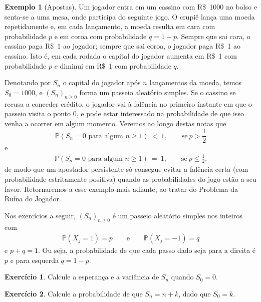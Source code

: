 \documentclass[12pt,portuguese]{article}
\theoremstyle{definition}
\newtheorem{example}[example]{Exemplo}
\theoremstyle{plainexercise}
\newtheorem{exercise}{Exercício}
\theoremstyle{starredexercise}
\theoremstyle{definition}
\begin{document}
\begin{example}[Apostas]\label{ex:apostas}
Um jogador entra em um cassino com R\$~1000 no bolso e senta-se a uma mesa,
onde participa do seguinte jogo. O crupiê lança uma moeda repetidamente e, em
cada lançamento, a moeda resulta em cara com probabilidade $p$ e em coroa com
probabilidade $q = 1 - p$. Sempre que sai cara, o cassino paga R\$~1 ao
jogador; sempre que sai coroa, o jogador paga R\$~1 ao cassino. Isto é, em
cada rodada o capital do jogador aumenta em R\$~1 com probabilidade $p$ e
diminui em R\$~1 com probabilidade $q$.

Denotando por $S_n$ o capital do jogador após $n$ lançamentos da moeda,
temos $S_0 = 1000$, e $(S_n)_{n \geqslant 0}$ forma um passeio aleatório
simples. Se o cassino se recusa a conceder crédito, o jogador vai à falência
no primeiro instante em que o passeio visita o ponto $0$, e pode estar
interessado na probabilidade de que isso venha a ocorrer em algum momento.
Veremos ao longo destas notas que
\begin{equation}\label{eq:ruina-exemplo}
  \mathbb{P}(S_n = 0 \text{ para algum } n \geqslant 1) \ < \ 1, \qquad \text{se}\ p>\frac{1}{2}
\end{equation}
e
\begin{align*}
\mathbb{P}(S_n = 0 \text{ para algum } n \geqslant 1) \ = \ 1,
\qquad  \text{se}\  p \leqslant \frac{1}{2}.
\end{align*}
de modo que um apostador persistente só consegue evitar a falência certa (com
probabilidade estritamente positiva) quando as probabilidades do jogo estão
a seu favor. Retornaremos a esse exemplo mais adiante, ao tratar do Problema
da Ruína do Jogador.
\end{example}



\bigskip 

Nos exercícios a seguir, $(S_n)_{n \geqslant 0}$ é um passeio aleatório
simples nos inteiros com 
\begin{align*}
\mathbb{P}(X_j=1)=p \qquad \text{e}\qquad \mathbb{P}(X_j=-1)=q
\end{align*}
e $p+q=1$. 
Ou seja, a probabilidade de que cada passo dado 
seja para a direita é $p$ e para esquerda $q=1-p$.

\begin{exercise}\label{exercise:media-variancia-sn}
Calcule a esperança e a variância de $S_n$ quando $S_0 = 0$.
\end{exercise}

\begin{exercise}\label{exercise:sn-extremo}
Calcule a probabilidade de que $S_n = n + k$, dado que $S_0 = k$.
\end{exercise}
\end{document}
